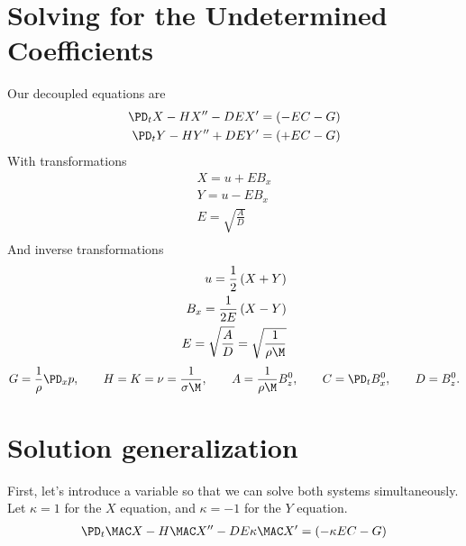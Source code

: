 \documentclass[11pt]{article}
\begin{document}
\doublespacing
\MOONSTITLE
\maketitle

\section{Solving for the Undetermined Coefficients}
Our decoupled equations are
\begin{equation}\begin{aligned}
\PD_t X - H X'' - DE X'  = (- EC -G)\\
\PD_t Y - H Y'' + DE Y'  = (+ EC -G)\\
\end{aligned} \end{equation}
With transformations
\begin{equation}\begin{aligned}
X = u + E B_x \\
Y = u - E B_x \\
E = \sqrt{\frac{A}{D}} \\
\end{aligned} \end{equation}
And inverse transformations
\begin{equation}\begin{aligned}
u   = \frac{1}{2} \left( X + Y \right) \\
B_x = \frac{1}{2E} \left( X - Y \right) \\
E = \sqrt{\frac{A}{D}} = \sqrt{\frac{1}{\rho \M}} \\
\end{aligned} \end{equation}
\begin{equation}\begin{aligned}
G = \frac{1}{\rho}\PD_x p, \qquad
H = K = \nu = \frac{1}{\sigma \M}, \qquad
A = \frac{1}{\rho \M} B_z^0, \qquad
C = \PD_t B_x^0, \qquad
D = B_z^0.
\end{aligned} \end{equation}

\section{Solution generalization}
First, let's introduce a variable so that we can solve both systems simultaneously. Let $\kappa = 1$ for the $X$ equation, and $\kappa = -1$ for the $Y$ equation.
\begin{equation}\begin{aligned}
	\PD_t \MAC X - H \MAC X'' - DE \kappa \MAC X'  = (- \kappa EC -G) \\
\end{aligned} \end{equation}
\end{document}
